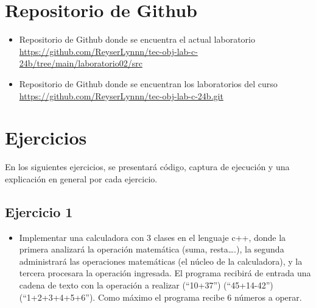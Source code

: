 \documentclass{article}
\begin{document}
\section{Repositorio de Github}
	\begin{itemize}
		\item Repositorio de Github donde se encuentra el actual laboratorio \\
		\url{https://github.com/ReyserLynnn/tec-obj-lab-c-24b/tree/main/laboratorio02/src}

        \item Repositorio de Github donde se encuentran los laboratorios del curso\\
		\url{https://github.com/ReyserLynnn/tec-obj-lab-c-24b.git}
	\end{itemize}
 
\section{Ejercicios}

En los siguientes ejercicios, se presentará código, captura de ejecución y una explicación en general por cada ejercicio.\\

    \subsection{Ejercicio 1}
        \begin{itemize}
            \item Implementar una calculadora con 3 clases en el lenguaje c++, donde la primera analizará la
            operación matemática (suma, resta….), la segunda administrará las operaciones matemáticas (el
            núcleo de la calculadora), y la tercera procesara la operación ingresada.
            El programa recibirá de entrada una cadena de texto con la operación a realizar
            (“10+37”) (“45+14-42”) (“1+2+3+4+5+6”). Como máximo el programa recibe 6 números a operar. 
        \end{itemize}  
        
        
\end{document}
